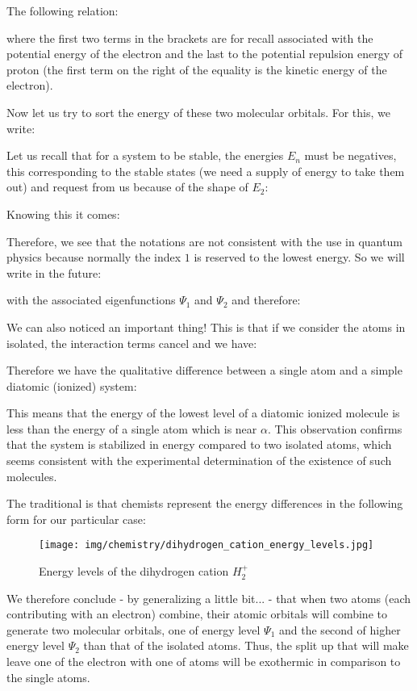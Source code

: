 	The following relation:
	
	where the first two terms in the brackets are for recall associated with the potential energy of the electron and the last to the potential repulsion energy of proton (the first term on the right of the equality is the kinetic energy of the electron).

	Now let us try to sort the energy of these two molecular orbitals. For this, we write:
	
	Let us recall that for a system to be stable, the energies  $E_n$ must be negatives, this corresponding to the stable states (we need a supply of energy to take them out) and request from us because of the shape of $E_2$:
	
	Knowing this it comes:
	
	Therefore, we see that the notations are not consistent with the use in quantum physics because normally the index $1$ is reserved to the lowest energy. So we will write in the future:
	
	with the associated eigenfunctions  $\Psi_1$ and $\Psi_2$ and therefore:
	
	We can also noticed an important thing! This is that if we consider the atoms in isolated, the interaction terms cancel and we have:
	
	Therefore we have the qualitative difference between a single atom and a simple diatomic (ionized) system:
	
	This means that the energy of the lowest level of a diatomic ionized molecule is less than the energy of a single atom which is near $\alpha$. This observation confirms that the system is stabilized in energy compared to two isolated atoms, which seems consistent with the experimental determination of the existence of such molecules.
	
	The traditional is that chemists represent the energy differences in the following form for our particular case:
	\begin{figure}[H]
		\begin{center}
		\texttt{[image: img/chemistry/dihydrogen\_cation\_energy\_levels.jpg]}
		\end{center}	
		\caption{Energy levels of the dihydrogen cation $H_2^+$}
	\end{figure}
	We therefore conclude - by generalizing a little bit... - that when two atoms (each contributing with an electron) combine, their atomic orbitals will combine to generate two molecular orbitals, one of energy level $\Psi_1$ and the second of higher energy level $\Psi_2$ than that of the isolated atoms. Thus, the split up that will make leave one of the electron with one of atoms will be exothermic in comparison to the single atoms.
	
